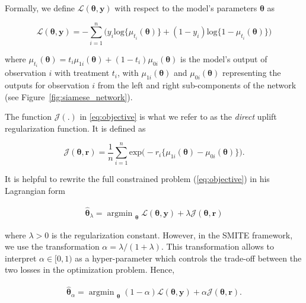 \documentclass{article}
\def\r{\mathbf r}
\def\y{\mathbf y}
\DeclareMathOperator*{\argmin}{argmin~} %
\begin{document}
Formally, we define $\mathcal{L}(\boldsymbol{\theta}, \y)$ with respect to the model's parameters $\boldsymbol{\theta}$ as 

\begin{equation*}
    \mathcal{L}(\boldsymbol{\theta}, \y) = - \sum_{i=1}^{n} \Big( y_i\mathrm{log} \{\mu_{t_i}(\boldsymbol{\theta})\} + (1-y_i) \mathrm{log} \{1-\mu_{t_i}(\boldsymbol{\theta})\} \Big)
\end{equation*}

where $\mu_{t_i}(\boldsymbol{\theta}) = t_i \mu_{1i}(\boldsymbol{\theta}) + (1-t_i) \mu_{0i}(\boldsymbol{\theta})$ is the model's output of observation $i$ with treatment $t_i$, with $\mu_{1i}(\boldsymbol{\theta})$ and $\mu_{0i}(\boldsymbol{\theta})$  representing the outputs for observation $i$ from the left and right sub-components of the network (see Figure~\ref{fig:siamese_network}).

The function $\mathcal{J}(.)$ in \eqref{eq:objective} is what we refer to as the \textit{direct} uplift regularization function. It is defined as 

\begin{equation}
    \mathcal{J}(\boldsymbol{\theta}, \r) =   \frac{1}{n} \sum_{i=1}^{n} \mathrm{exp}\Big(- r_i \{{\mu_{1i}}(\boldsymbol{\theta }) - {\mu_{0i}}(\boldsymbol{\theta})\} \Big).
    \label{eq:direct_uplift_loss}
\end{equation}

It is helpful to rewrite the full constrained problem (\ref{eq:objective}) in his Lagrangian form

\begin{align*}
    {\boldsymbol{\hat\theta}}_{\lambda} =  \argmin_{\boldsymbol{\theta}} \mathcal{L}(\boldsymbol{\theta}, \y) + \lambda \mathcal{J}(\boldsymbol{\theta}, \r)
\end{align*}

where $\lambda > 0$ is the regularization constant. However, in the SMITE framework, we use the transformation $\alpha = \lambda / (1+\lambda)$. This transformation allows to interpret $\alpha \in [0,1)$ as a hyper-parameter which controls the trade-off between the two losses in the optimization problem. Hence,

\begin{align}
    {\boldsymbol{\hat\theta}}_{\alpha} = \argmin_{\boldsymbol{\theta}} (1 - \alpha)  \mathcal{L}(\boldsymbol{\theta}, \y) + \alpha \mathcal{J}(\boldsymbol{\theta}, \r).
    \label{eq:SMITE_objective}
\end{align}
\end{document}
